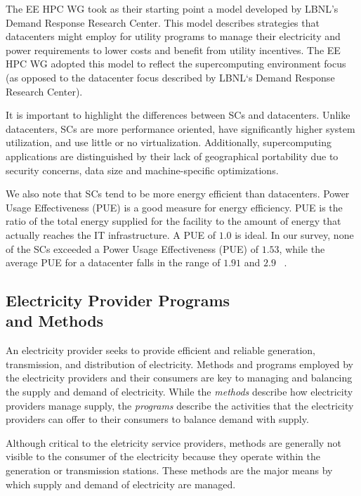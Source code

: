 The EE HPC WG took as their starting point a
model developed by LBNL's Demand Response Research
Center. This model describes strategies that datacenters might employ for utility programs to manage their electricity and
power requirements to lower costs and benefit from utility
incentives. The EE HPC WG adopted this model %
to reflect the supercomputing environment
focus (as opposed to %
the datacenter focus described by LBNL`s Demand
Response Research Center).

It is important to highlight the differences between SCs and datacenters. Unlike datacenters, SCs are more performance oriented, have significantly higher system utilization, and use little or no virtualization. 
Additionally, supercomputing
applications are distinguished by their lack of geographical
portability due to security concerns, data size and machine-specific
optimizations.  

We also note that SCs tend to be more
energy efficient than datacenters. Power Usage Effectiveness (PUE) is a good measure for energy efficiency. PUE is the ratio of the total energy supplied for the facility to the amount of energy that actually reaches the IT infrastructure. A PUE of $1.0$ is ideal. In our survey, none of the SCs exceeded a Power Usage Effectiveness (PUE) of $1.53$, while the average PUE for a datacenter falls in the range of $1.91$ and $2.9$ ~\cite{Niccolai}.

\subsection{Electricity Provider Programs\\
and Methods}
\label{sub:EPP}
An electricity provider seeks to provide efficient and reliable generation, transmission, and 
distribution of electricity. Methods and programs employed by the electricity providers and their consumers 
are key to managing and balancing the supply and demand of electricity. While the \textit{methods} 
describe how 
electricity providers manage supply, the \textit{programs} describe the activities that 
the electricity providers 
can offer to their consumers to balance demand with supply.

Although critical to the eletricity service providers, methods 
are generally not visible to the consumer of the electricity because they
operate within the generation  or transmission stations.
These methods are the major means by which supply and demand of electricity are managed.

